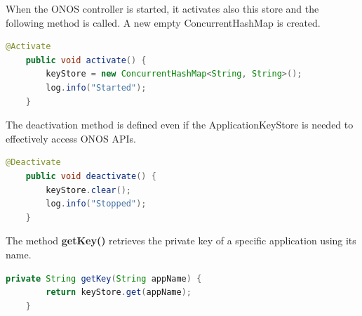 When the ONOS controller is started, it activates also this store and the following method is called. A new empty ConcurrentHashMap is created.
\begin{lstlisting}[language=java,firstnumber=53]
    @Activate
    public void activate() {
        keyStore = new ConcurrentHashMap<String, String>();
        log.info("Started");
    }
\end{lstlisting}

The deactivation method is defined even if the ApplicationKeyStore is needed to effectively access ONOS APIs.
\begin{lstlisting}[language=java,firstnumber=60]
    @Deactivate
    public void deactivate() {
        keyStore.clear();
        log.info("Stopped");
    }
\end{lstlisting}

The method \textbf{getKey()} retrieves the private key of a specific application using its name.
\begin{lstlisting}[language=java,firstnumber=67]
    private String getKey(String appName) {
        return keyStore.get(appName);
    }
\end{lstlisting}

